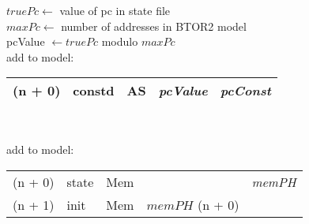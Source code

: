 \begin{algorithm}
    $truePc \leftarrow$ value of pc in state file\\
    $maxPc \leftarrow$ number of addresses in BTOR2 model\\
    \textcolor{UniBlue}{pcValue} $\leftarrow truePc$ modulo $maxPc$\\
    add to model:\\
    \begin{tabular}[h]{>{\color{UniRed}}r l >{\color{UniGrey}}l l >{\slshape} l}
        \hline
        \hline
        \ttfamily
        (n + 0) & constd & AS & \textcolor{UniBlue}{\rmfamily\textsl{pcValue}} & pcConst \\
        \hline
        \hline
    \end{tabular}\\
    \BlankLine

    \BlankLine
    add to model:\\

    \begin{tabular}[h]{>{\ttfamily\color{UniRed}}r >{\ttfamily}l >{\ttfamily\color{UniGrey}}l >{\ttfamily}l >{\slshape} l}
        \hline
        \hline
        (n + 0) & state & Mem &                                     & memPH \\
        (n + 1) & init  & Mem & \textcolor{UniRed}{$memPH$ (n + 0)} &       \\
        \hline
        \hline
    \end{tabular}\\


\end{algorithm}

